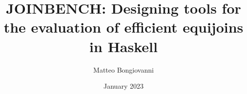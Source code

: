 \documentclass[a4paper, twoside]{report}
\title{JOINBENCH: Designing tools for the evaluation of efficient equijoins in Haskell}
\author{Matteo Bongiovanni}
\date{January 2023}
\begin{document}
\begin{comment}
General Information
The project report (occasionally referred to as a thesis) is an extremely
important aspect of the project. It serves to show what you have achieved and
should demonstrate that:

You understand the wider context of computing by relating your choice of project,
and the approach you take, to existing products or research.
You can apply the theoretical and practical techniques taught in the course to the
problem you are addressing and that you understand their relevance to the wider
world of computing.
You are capable of objectively criticising your own work and making constructive
suggestions for improvements or further work based on your experiences so far.
As a computing professional, you operate ethically and can explain your thinking
and working processes clearly and concisely to third parties who may not be
experts in the field in which you are working.
Most of the project assessors will not have followed the project throughout and
will only have a short time to listen to a presentation or see a demonstration.
For this reason they will rely heavily on the report to judge the project

Many students underestimate the importance of the report and make the mistake of
thinking that top marks can be achieved simply for producing a good product. This
is fundamentally not the case and many projects have been graded well below their
potential because of an indifferent or poor write-up. In order to get the balance
right you should consider that the aim of the project is to produce a good report
and that software, hardware, theory etc. that you developed during the project are
merely a means to this end. Don't make the mistake of leaving the write-up to the
last minute. Ideally you should produce the bulk of the report as you go along and
use the last week or two to bring it together into a coherent document.

It is helpful to get feedback from your supervisor about your project report, but
supervisors cannot be expected to look at documents written at the last minute or
at more than one chapter at a time. Allow plenty of time for this

Project Report Length
The nominal maximum report length is 60 pages, plus appendices. Shorter reports
may be appropriate for many projects and longer reports can be submitted with
prior approval (see below).

The page count includes:


\end{comment}
\end{document}
